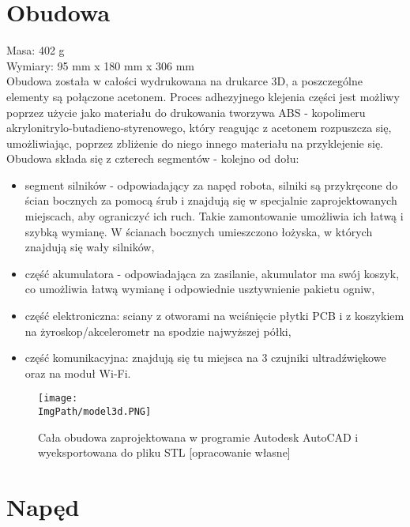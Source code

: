 \documentclass[a4paper,12pt,twoside,openany]{report}
\newcommand{\ImgPath}{.}
\begin{document}
\section{Obudowa}

\noindent Masa: 402 g\\
Wymiary: 95 mm x 180 mm x 306 mm\\

Obudowa została w całości wydrukowana na drukarce 3D, a poszczególne elementy są połączone acetonem. Proces adhezyjnego klejenia części jest możliwy poprzez użycie jako materiału do drukowania tworzywa ABS - kopolimeru akrylonitrylo-butadieno-styrenowego, który reagując z acetonem rozpuszcza się, umożliwiając, poprzez zbliżenie do niego innego materiału na przyklejenie się. 
\newpage
\noindent Obudowa składa się z czterech segmentów - kolejno od dołu:
\begin{itemize}
\item segment silników - odpowiadający za napęd robota, silniki są przykręcone do ścian bocznych za pomocą śrub i znajdują się w specjalnie zaprojektowanych miejscach, aby ograniczyć ich ruch. Takie zamontowanie umożliwia ich łatwą i szybką wymianę. W ścianach bocznych umieszczono łożyska, w których znajdują się wały silników,
\item część akumulatora - odpowiadająca za zasilanie, akumulator ma swój koszyk, co umożliwia łatwą wymianę i odpowiednie usztywnienie pakietu ogniw,
\item część elektroniczna: sciany z otworami na wciśnięcie płytki PCB i z koszykiem na żyroskop/akcelerometr na spodzie najwyższej półki,
\item część komunikacyjna: znajdują się tu miejsca na 3 czujniki ultradźwiękowe oraz na moduł Wi-Fi.
\end{itemize}

\begin{figure}[!htbp]
	\begin{center}
\centering
\texttt{[image: \\ImgPath/model3d.PNG]}
\end{center}
	\caption{Cała obudowa zaprojektowana w programie Autodesk AutoCAD i wyeksportowana do pliku STL [opracowanie własne]}
	\label{model3d}
\end{figure}

\newpage

\section{Napęd}
\end{document}
